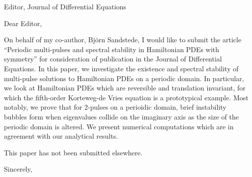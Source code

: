 \documentclass[11pt]{letter}
\begin{document}
\address{Ross Parker \\
Department of Mathematics \\
Southern Methodist University \\
Dallas, TX 75275 \\
\texttt{rhparker@smu.edu}}%
\signature{Ross Parker}
\begin{letter}{Editor, Journal of Differential Equations}

\opening{Dear Editor,}

On behalf of my co-author, Bj\"orn Sandstede, I would like to submit the article ``Periodic multi-pulses and spectral stability in Hamiltonian PDEs with symmetry'' for consideration of publication in the Journal of Differential Equations. In this paper, we investigate the existence and spectral stability of multi-pulse solutions to Hamiltonian PDEs on a periodic domain. In particular, we look at Hamiltonian PDEs which are reversible and translation invariant, for which the fifth-order Korteweg-de Vries equation is a prototypical example. Most notably, we prove that for 2-pulses on a perioidic domain, brief instability bubbles form when eigenvalues collide on the imaginary axis as the size of the periodic domain is altered. We present numerical computations which are in agreement with our analytical results.

This paper has not been submitted elsewhere.

\closing{Sincerely,}

\end{letter}
\end{document}
